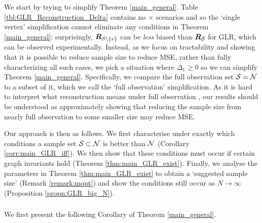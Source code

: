 \subsubsection{}
We start by trying to simplify Theorem \ref{main_general}. Table \ref{tbl:GLR_Reconstruction_Delta} contains no $\times$ scenarios and so the `single vertex' simplification cannot eliminate any conditions in Theorem \ref{main_general}: surprisingly, $\bm{R}_{\mathcal{S} \backslash \{ v \}}$ can be \emph{less} biased than $\bm{R}_{\mathcal{S}}$ for GLR, which can be observed experimentally.
Instead, as we focus on tractability and showing that it is possible to reduce sample size to reduce MSE, rather than fully characterizing all such cases, we pick a situation where $\Delta_{1} \geq 0$ so we can simplify Theorem \ref{main_general}. Specifically, we compare the full observation set $\mathcal{S}=\mathcal{N}$ to a subset of it, which we call the `full observation' simplification. As it is hard to interpret what reconstruction means under full observation \cite{chen2017GLRbias}, our results should be understood as approximately showing that reducing the sample size from nearly full observation to some smaller size may reduce MSE.

Our approach is then as follows. We first characterise under exactly which conditions a sample set $\mathcal{S} \subset \mathcal{N}$ is better than $\mathcal{N}$ (Corollary \ref{corr:main_GLR_iff}). We then show that these conditions must occur if certain graph invariants hold (Theorem \ref{thm:main_GLR_exist}). Finally, we analyse the parameters in Theorem \ref{thm:main_GLR_exist} to obtain a `suggested sample size' (Remark \ref{remark:mopt}) and show the conditions still occur as $N \to \infty$ (Proposition \ref{propn:GLR_big_N}). 

\subsubsection{}
We first present the following Corollary of Theorem \ref{main_general}.

